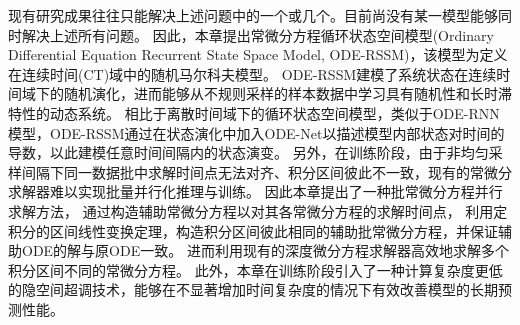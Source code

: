 现有研究成果往往只能解决上述问题中的一个或几个。目前尚没有某一模型能够同时解决上述所有问题。
因此，本章提出常微分方程循环状态空间模型(Ordinary Differential Equation Recurrent State Space Model, ODE-RSSM)，该模型为定义在连续时间(CT)域中的随机马尔科夫模型。
ODE-RSSM建模了系统状态在连续时间域下的随机演化，进而能够从不规则采样的样本数据中学习具有随机性和长时滞特性的动态系统。
相比于离散时间域下的循环状态空间模型，类似于ODE-RNN模型，ODE-RSSM通过在状态演化中加入ODE-Net以描述模型内部状态对时间的导数，以此建模任意时间间隔内的状态演变。
另外，在训练阶段，由于非均匀采样间隔下同一数据批中求解时间点无法对齐、积分区间彼此不一致，现有的常微分求解器难以实现批量并行化推理与训练。
因此本章提出了一种批常微分方程并行求解方法，
通过构造辅助常微分方程以对其各常微分方程的求解时间点，
利用定积分的区间线性变换定理，构造积分区间彼此相同的辅助批常微分方程，并保证辅助ODE的解与原ODE一致。
进而利用现有的深度微分方程求解器高效地求解多个积分区间不同的常微分方程。
此外，本章在训练阶段引入了一种计算复杂度更低的隐空间超调技术，能够在不显著增加时间复杂度的情况下有效改善模型的长期预测性能。

